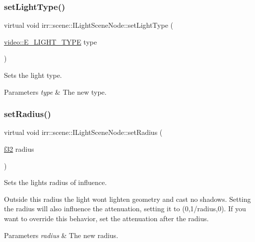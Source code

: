 \subsubsection{\texorpdfstring{set\+Light\+Type()}{setLightType()}}
{\footnotesize\ttfamily virtual void irr\+::scene\+::\+I\+Light\+Scene\+Node\+::set\+Light\+Type (\begin{DoxyParamCaption}\item[{\hyperlink{namespaceirr_1_1video_aaf0e02f6f83cc35cf9e764bf18400d39}{video\+::\+E\+\_\+\+L\+I\+G\+H\+T\+\_\+\+T\+Y\+PE}}]{type }\end{DoxyParamCaption})\hspace{0.3cm}{\ttfamily [pure virtual]}}



Sets the light type. 


\begin{DoxyParams}{Parameters}
{\em type} & The new type. \\
\hline
\end{DoxyParams}
\mbox{\label{classirr_1_1scene_1_1ILightSceneNode_a7da64c8c4776988a39927827f2c3f364}} 
\subsubsection{\texorpdfstring{set\+Radius()}{setRadius()}}
{\footnotesize\ttfamily virtual void irr\+::scene\+::\+I\+Light\+Scene\+Node\+::set\+Radius (\begin{DoxyParamCaption}\item[{\hyperlink{namespaceirr_a0277be98d67dc26ff93b1a6a1d086b07}{f32}}]{radius }\end{DoxyParamCaption})\hspace{0.3cm}{\ttfamily [pure virtual]}}



Sets the light\textquotesingle{}s radius of influence. 

Outside this radius the light won\textquotesingle{}t lighten geometry and cast no shadows. Setting the radius will also influence the attenuation, setting it to (0,1/radius,0). If you want to override this behavior, set the attenuation after the radius. 
\begin{DoxyParams}{Parameters}
{\em radius} & The new radius. \\
\hline
\end{DoxyParams}
\mbox{\label{classirr_1_1scene_1_1ILightSceneNode_a3a6a6681a665ec4c214cda8a84a29337}} 
